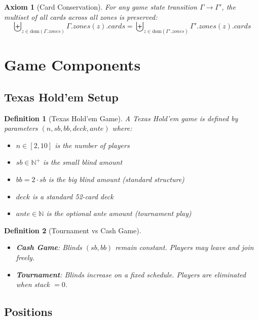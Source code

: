 \documentclass[11pt,a4paper]{article}
\newtheorem{definition}{Definition}[section]
\newtheorem{axiom}{Axiom}[section]
\begin{document}
\begin{axiom}[Card Conservation]
\label{ax:card-conservation}
For any game state transition $\Gamma \to \Gamma'$, the multiset of all cards across all zones is preserved:
\[
\biguplus_{z \in \text{dom}(\Gamma.zones)} \Gamma.zones(z).cards = \biguplus_{z \in \text{dom}(\Gamma'.zones)} \Gamma'.zones(z).cards
\]
\end{axiom}

\section{Game Components}
\label{sec:game-components}

\subsection{Texas Hold'em Setup}

\begin{definition}[Texas Hold'em Game]
A Texas Hold'em game is defined by parameters $(n, sb, bb, deck, ante)$ where:
\begin{itemize}
    \item $n \in [2, 10]$ is the number of players
    \item $sb \in \mathbb{N}^+$ is the small blind amount
    \item $bb = 2 \cdot sb$ is the big blind amount (standard structure)
    \item $deck$ is a standard 52-card deck
    \item $ante \in \mathbb{N}$ is the optional ante amount (tournament play)
\end{itemize}
\end{definition}

\begin{definition}[Tournament vs Cash Game]
\begin{itemize}
    \item \textbf{Cash Game}: Blinds $(sb, bb)$ remain constant. Players may leave and join freely.
    \item \textbf{Tournament}: Blinds increase on a fixed schedule. Players are eliminated when stack $= 0$.
\end{itemize}
\end{definition}

\subsection{Positions}
\end{document}
